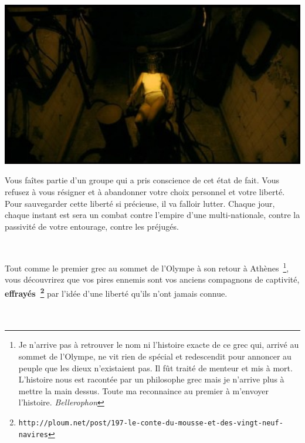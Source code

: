 \documentclass[11pt,twoside,a4paper]{article}
\begin{document}
\begin{minipage}[ht]{14.10cm}
	\includegraphics[width=14.05cm]{img/avalon_game.jpg}
\end{minipage} \hfill \begin{minipage}[ht]{0.30\textwidth}
	Vous fa{\^i}tes partie d'un groupe qui a pris conscience de cet {\'e}tat de fait. Vous refusez {\`a} vous r{\'e}signer et {\`a} abandonner votre choix personnel et votre libert{\'e}. Pour sauvegarder cette libert{\'e} si pr{\'e}cieuse, il va falloir lutter. Chaque jour, chaque instant est sera un combat contre l'empire d'une multi-nationale, contre la passivit{\'e} de votre entourage, contre les pr{\'e}jug{\'e}s.~\\
\end{minipage}~\\

\vfill
\clearpage
\vfill

Tout comme le premier grec au sommet de l'Olympe {\`a} son retour {\`a} Ath{\`e}nes~\footnote{Je n'arrive pas {\`a} retrouver le nom ni l'histoire exacte de ce grec qui, arriv{\'e} au sommet de l'Olympe, ne vit rien de sp{\'e}cial et redescendit pour annoncer au peuple que les dieux n'existaient pas. Il f{\^u}t trait{\'e} de menteur et mis {\`a} mort. L'histoire nous est racont{\'e}e par un philosophe grec mais je n'arrive plus {\`a} mettre la main dessus. Toute ma reconnaince au premier {\`a} m'envoyer l'histoire. \emph{Bellerophon} }, vous d{\'e}couvrirez que vos pires ennemis sont vos anciens compagnons de captivit{\'e}, \textbf{effray{\'e}s~\footnote{\texttt {http://ploum.net/post/197-le-conte-du-mousse-et-des-vingt-neuf-navires}}} par l'id{\'e}e d'une libert{\'e} qu'ils n'ont jamais connue.~\\~\\~\\
\end{document}
